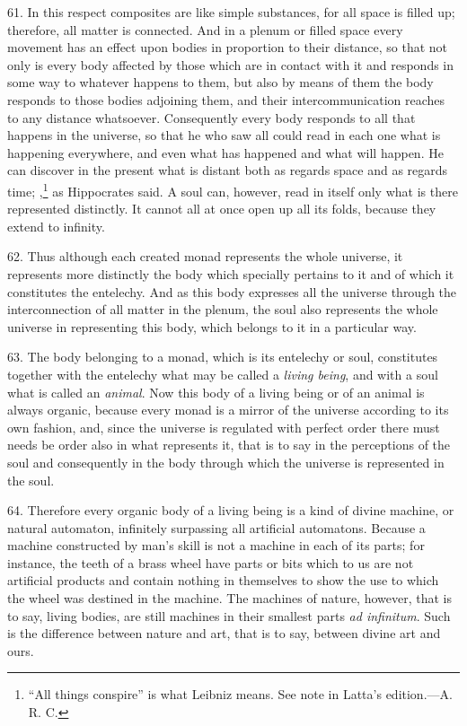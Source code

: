 61. In this respect composites are like simple substances, for all
space is filled up; therefore, all matter is connected. And in a
plenum or filled space every movement has an effect upon bodies in
proportion to their distance, so that not only is every body affected
by those which are in contact with it and responds in some way to
whatever happens to them, but also by means of them the body responds
to those bodies adjoining them, and their intercommunication reaches
to any distance whatsoever. Consequently every body responds to all
that happens in the universe, so that he who saw all could read in
each one what is happening everywhere, and even what has happened and
what will happen. He can discover in the present what is distant both
as regards space and as regards time; ,\footnote{``All things conspire'' is what Leibniz means. See
note in Latta's edition.---A. R. C.} as Hippocrates said. A soul can,
however, read in itself only what is there represented distinctly. It
cannot all at once open up all its folds, because they extend to
infinity.

62. Thus although each created monad represents the whole universe, it
represents more distinctly the  body which specially
pertains to it and of which it constitutes the entelechy. And as this
body expresses all the universe through the interconnection of all
matter in the plenum, the soul also represents the whole universe in
representing this body, which belongs to it in a particular way.

63. The body belonging to a monad, which is its entelechy or soul,
constitutes together with the entelechy what may be called a
\textit{living being}, and with a soul what is called an
\textit{animal}. Now this body of a living being or of an animal is
always organic, because every monad is a mirror of the universe
according to its own fashion, and, since the universe is regulated
with perfect order there must needs be order also in what represents
it, that is to say in the perceptions of the soul and consequently in
the body through which the universe is represented in the soul.

64. Therefore every organic body of a living being is a kind of divine
machine, or natural automaton, infinitely surpassing all artificial
automatons. Because a machine constructed by man's skill is not a
machine in each of its parts; for instance, the teeth of a brass wheel
have parts or bits which to us are not artificial products and contain
nothing in themselves to show the use to which the wheel was destined
in the machine. The machines of nature, however, that is to say,
living bodies, are still machines in their smallest parts \textit{ad
infinitum}. Such is the difference between nature and art, that is to
say, between divine art and ours.

